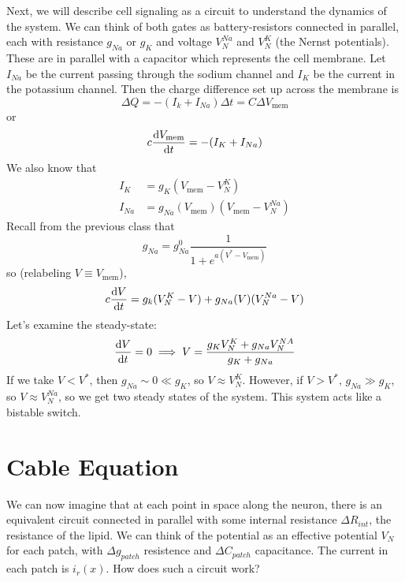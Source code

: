 \documentclass[a4paper,twoside,master.tex]{subfiles}
\begin{document}

Next, we will describe cell signaling as a circuit to understand the dynamics of the system. We can think of both gates as battery-resistors connected in parallel, each with resistance $ g_{Na} $ or $ g_K $ and voltage $ V_N^{Na} $ and $ V_N^K $ (the Nernst potentials). These are in parallel with a capacitor which represents the cell membrane. Let $ I_{Na} $ be the current passing through the sodium channel and $ I_K $ be the current in the potassium channel. Then the charge difference set up across the membrane is
\begin{equation}
    \Delta Q = - (I_k + I_{Na}) \Delta t = C \Delta V_{\text{mem}}
\end{equation}
or
\begin{equation}
    c \dv{V_{\text{mem}}}{t} = -(I_K + I_{Na})
\end{equation}
We also know that
\begin{align}
    I_K &= g_K (V_{\text{mem}} - V_N^K) \\
    I_{Na} &= g_{Na}(V_{\text{mem}}) (V_{\text{mem}} - V_N^{Na})
\end{align}
Recall from the previous class that
\begin{equation}
    g_{Na} = g_{Na}^0 \frac{1}{1 + e^{a(V^* - V_{\text{mem}})}}
\end{equation}
so (relabeling $ V \equiv V_{\text{mem}} $),
\begin{equation}
    c \dv{V}{t} = g_k(V_N^K - V) + g_{Na}(V) (V_N^{Na} - V)
\end{equation}
Let's examine the steady-state:
\begin{equation}
    \dv{V}{t} = 0 \implies V = \frac{g_K V_N^K + g_{Na} V_N^{NA}}{g_K + g_{Na}}
\end{equation}
If we take $ V < V^* $, then $ g_{Na} \sim 0 \ll g_K $, so $ V \approx V_N^K $. However, if $ V > V^* $, $ g_{Na} \gg g_K $, so $ V \approx V_N^{Na} $, so we get two steady states of the system. This system acts like a bistable switch.


\section{Cable Equation}\label{sec:cable_equation}


We can now imagine that at each point in space along the neuron, there is an equivalent circuit connected in parallel with some internal resistance $ \Delta R_{int} $, the resistance of the lipid. We can think of the potential as an effective potential $ V_N $ for each patch, with $ \Delta g_{patch} $ resistence and $ \Delta C_{patch} $ capacitance. The current in each patch is $ i_r(x) $. How does such a circuit work?
\end{document}
